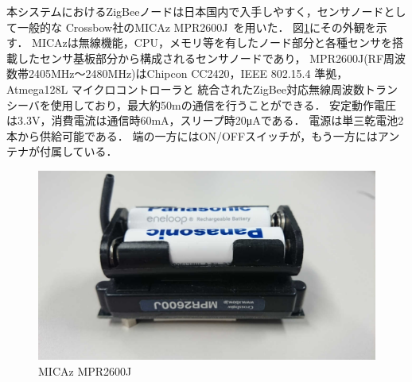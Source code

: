 \documentclass[12pt]{jreport}
\begin{document}

本システムにおけるZigBeeノードは日本国内で入手しやすく，センサノードとして一般的な
Crossbow社のMICAz MPR2600J~\cite{Product/crossbow:micaz}を用いた．
図\ref{fig:mpr2600j}にその外観を示す．
MICAzは無線機能，CPU，メモリ等を有したノード部分と各種センサを搭載したセンサ基板部分から構成されるセンサノードであり，
MPR2600J(RF周波数帯2405MHz～2480MHz)はChipcon CC2420，IEEE 802.15.4 準拠，Atmega128L マイクロコントローラと
統合されたZigBee対応無線周波数トランシーバを使用しており，最大約50mの通信を行うことができる．
安定動作電圧は3.3V，消費電流は通信時60mA，スリープ時20μAである．
電源は単三乾電池2本から供給可能である．
端の一方にはON/OFFスイッチが，もう一方にはアンテナが付属している．

\begin{figure}[bt]
 \centering
 \includegraphics[width=\columnwidth]{figure/mpr2600j.pdf}
 \caption{MICAz MPR2600J}
 \label{fig:mpr2600j}
\end{figure}

\end{document}
